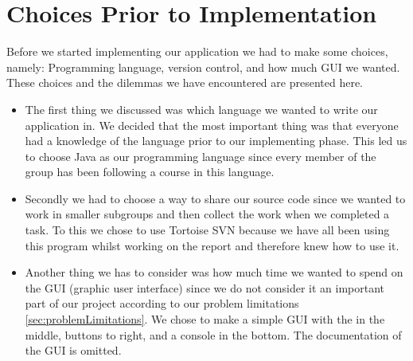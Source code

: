 \chapter{Choices Prior to Implementation}
Before we started implementing our application we had to make some choices, namely: Programming language, version control, and how much GUI we wanted.
These choices and the dilemmas we have encountered are presented here.

\begin{itemize}
	\item The first thing we discussed was which language we wanted to write our application in.
We decided that the most important thing was that everyone had a knowledge of the language prior to our implementing phase.
This led us to choose Java as our programming language since every member of the group has been following a course in this language.

	\item Secondly we had to choose a way to share our source code since we wanted to work in smaller subgroups and then collect the work when we completed a task.
To this we chose to use Tortoise SVN because we have all been using this program whilst working on the report and therefore knew how to use it.

	\item Another thing we has to consider was how much time we wanted to spend on the GUI (graphic user interface) since we do not consider it an important part of our project according to our problem limitations \ref{sec:problemLimitations}.
We chose to make a simple GUI with the \rubik{} in the middle, buttons to right, and a console in the bottom.
The documentation of the GUI is omitted.
\end{itemize}

